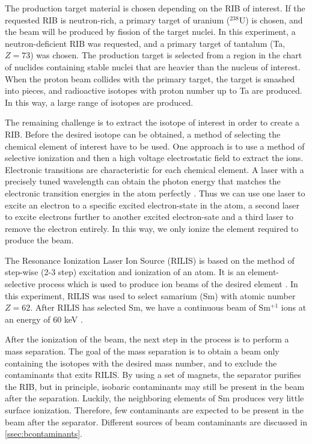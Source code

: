 \documentclass[twoside,english]{uiofysmaster/uiofysmaster}
\let\orgautoref\autoref
\renewcommand{\autoref}
        {%
		 \def\sectionautorefname{Section}%
		 \def\subsectionautorefname{Section}%
		 \def\subsubsectionautorefname{Section}%
		 \def\chapterautorefname{Chapter}%
          \orgautoref}
\begin{document}
The production target material is chosen depending on the RIB of interest. 
If the requested RIB is neutron-rich, a primary target of uranium ($^{238}$U) is chosen, and the beam will be produced by fission of the target nuclei.
In this experiment, a neutron-deficient RIB was requested, and a primary target of tantalum (Ta, $Z = 73$) was chosen.
The production target is selected from a region in the chart of nuclides containing stable nuclei that are heavier than the nucleus of interest.
When the proton beam collides with the primary target, the target is smashed into pieces, and radioactive isotopes with proton number up to Ta are produced.
In this way, a large range of isotopes are produced. 

The remaining challenge is to extract the isotope of interest in order to create a RIB. 
Before the desired isotope can be obtained, a method of selecting the chemical element of interest have to be used.
One approach is to use a method of selective ionization and then a high voltage electrostatic field to extract the ions. 
Electronic transitions are characteristic for each chemical element. 
A laser with a precisely tuned wavelength can obtain the photon energy that matches the electronic transition energies in the atom perfectly \cite{RILIS-web, RILIS2013}. 
Thus we can use one laser to excite an electron to a specific excited electron-state in the atom, a second laser to excite electrons further to another excited electron-sate and a third laser to remove the electron entirely. 
In this way, we only ionize the element required to produce the beam. 

The Resonance Ionization Laser Ion Source (RILIS) is based on the method of step-wise (2-3 step) excitation and ionization of an atom. 
It is an element-selective process which is used to produce ion beams of the desired element \cite{RILIS}. 
In this experiment, RILIS was used to select samarium (Sm) with atomic number $Z = 62$. 
After RILIS has selected Sm, we have a continuous beam of Sm$^{+1}$ ions at an energy of 60 keV  \cite{ISOLDE-web, TIF}. 

After the ionization of the beam, the next step in the process is to perform a mass separation.
The goal of the mass separation is to obtain a beam only containing the isotopes with the desired mass number, and to exclude the contaminants that exits RILIS. 
By using a set of magnets, the separator purifies the RIB, but in principle, isobaric contaminants may still be present in the beam after the separation. 
Luckily, the neighboring elements of Sm produces very little surface ionization. 
Therefore, few contaminants are expected to be present in the beam after the separator. 
Different sources of beam contaminants are discussed in \autoref{ssec:bcontaminants}.
\end{document}
